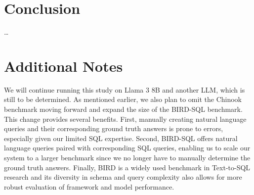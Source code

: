 \documentclass[10pt,twocolumn]{article}
\begin{document}
\section{Conclusion}

\ldots

\section{Additional Notes}

We will continue running this study on Llama 3 8B and another LLM, which is still to be determined. As mentioned earlier, we also plan to omit the Chinook benchmark moving forward and expand the size of the BIRD-SQL benchmark. This change provides several benefits. First, manually creating natural language queries and their corresponding ground truth answers is prone to errors, especially given our limited SQL expertise. Second, BIRD-SQL offers natural language queries paired with corresponding SQL queries, enabling us to scale our system to a larger benchmark since we no longer have to manually determine the ground truth answers. Finally, BIRD is a widely used benchmark in Text-to-SQL research and its diversity in schema and query complexity also allows for more robust evaluation of framework and model performance.
\end{document}
